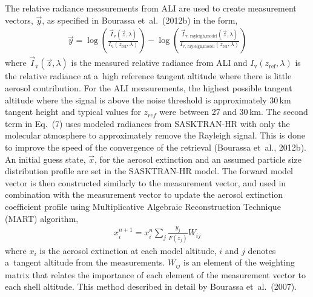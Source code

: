 \documentclass[amtd, online, hvmath]{copernicus}
\begin{document}
The relative radiance measurements from ALI are used to create measurement
vectors, $\vec{y}$, as specified in Bourassa et~al.~(2012b) in the form,
\begin{align}
  \vec{y}=\log%
  \left(\frac{\vec{I}_{\mathrm{v}}\left(\vec{z},\lambda
      \right)}{I_{\mathrm{v}}\left(z_{\text{ref}},\lambda \right)}
  \right)-\log {\left(\frac{\vec{I}_{\text{v,
            rayleigh,model}}\left(\vec{z},\lambda \right)}{I_{\text{v,
            rayleigh,model}}\left(z_{\text{ref}},\lambda \right)}
    \right)}
\end{align}
where $\vec{I}_{\mathrm{v}}\left(\vec{z},\lambda \right)$ is the measured
relative radiance from ALI and $I_{\mathrm{v}}\left(z_{\text{ref}},\lambda
\right)$ is the relative radiance at a~high reference tangent altitude where
there is little aerosol contribution. For the ALI measurements, the highest
possible tangent altitude where the signal is above the noise threshold is
approximately 30\,\unit{km} tangent height and typical values for $z_{ref}$ were between 27 and 30\,\unit{km}. The second term in Eq.~(7) uses
modeled radiances from SASKTRAN-HR with only the molecular atmosphere to
approximately remove the Rayleigh signal. This is done to improve the speed
of the convergence of the retrieval (Bourassa et~al., 2012b). An initial
guess state, $\vec{x}$, for the aerosol extinction and an assumed particle
size distribution profile are set in the SASKTRAN-HR model. The forward model
vector is then constructed similarly to the measurement vector, and used in
combination with the measurement vector to update the aerosol extinction
coefficient profile using Multiplicative Algebraic Reconstruction Technique
(MART) algorithm,
\begin{align}
x_{{i}}^{n+1}=x_{{i}}^{n}\sum\limits_j \frac{y_{j}}{F\left(z_{j} \right)}
W_{{ij}}
\end{align}
where $x_{{i}}$ is the aerosol extinction at each model altitude, $i$ and $j$
denotes a~tangent altitude from the measurements. $W_{{ij}}$ is an element of
the weighting matrix that relates the importance of each element of the
measurement vector to each shell altitude. This method described in detail by
Bourassa et~al.~(2007).
\end{document}
